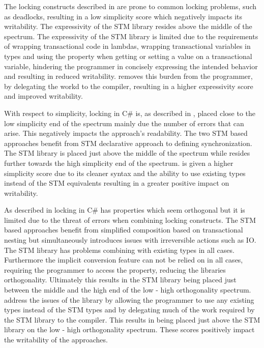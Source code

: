 The locking constructs described in  are prone to common locking problems, such as deadlocks, resulting in a low simplicity score which negatively impacts its writability. The expressivity of the \ac{STM} library resides above the middle of the spectrum. The expressivity of the \ac{STM} library is limited due to the requirements of wrapping transactional code in lambdas, wrapping transactional variables in  types and using the  property when getting or setting a value on a transactional variable, hindering the programmer in concisely expressing the intended behavior and resulting in reduced writability. \stmname removes this burden from the programmer, by delegating the workd to the compiler, resulting in a higher expressivity score and improved writability.

With respect to simplicity, locking in C\# is, as described in , placed close to the low simplicity end of the spectrum mainly due the number of errors that can arise. This negatively impacts the approach's readability. The two \ac{STM} based approaches benefit from \ac{STM} declarative approach to defining synchronization. The \ac{STM} library is placed just above the middle of the spectrum while \stmname resides further towards the high simplicity end of the spectrum. \stmname is given a higher simplicity score due to its cleaner syntax and the ability to use existing types instead of the \ac{STM} equivalents resulting in a greater positive impact on writability.

As described in  locking in C\# has properties which seem orthogonal but it is limited due to the threat of errors when combining locking constructs. The \ac{STM} based approaches benefit from simplified composition based on transactional nesting but simultaneously introduces issues with irreversible actions such as \ac{IO}. The \ac{STM} library has problems combining with existing types in all cases. Furthermore the implicit conversion feature can not be relied on in all cases, requiring the programmer to access the  property, reducing the libraries orthogonality. Ultimately this results in the \ac{STM} library being placed just between the middle and the high end of the low - high orthogonality spectrum. \stmname address the issues of the  library by allowing the programmer to use any existing types instead of the \ac{STM} types and by delegating much of the work required by the \ac{STM} library to the compiler. This results in \stmname being placed just above the \ac{STM} library on the  low - high orthogonality spectrum. These scores positively impact the writability of the approaches.

